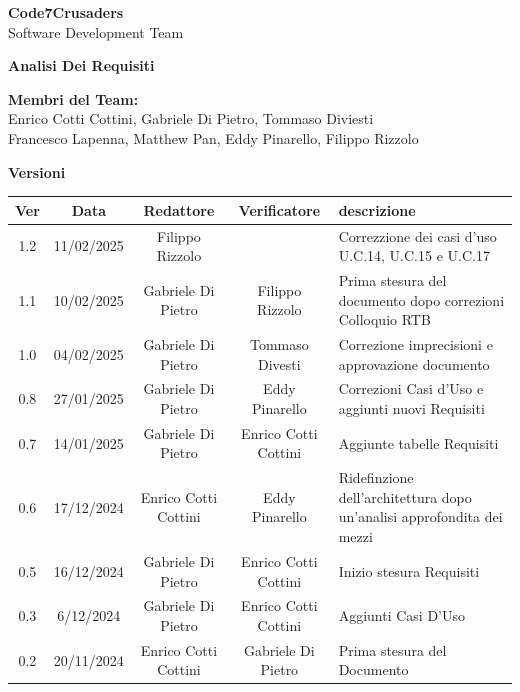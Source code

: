 \documentclass{article}
\begin{document}
\begin{titlepage}
    {\Huge \textbf{Code7Crusaders}}\\
    \vspace{0.5cm}
    {\Large Software Development Team}\\
    \vspace{2cm}
    
    \large \textbf{Analisi Dei Requisiti}
    \vspace{3.9cm}

    \textbf{Membri del Team:}\\
    Enrico Cotti Cottini, Gabriele Di Pietro, Tommaso Diviesti \\
    Francesco Lapenna, Matthew Pan, Eddy Pinarello, Filippo Rizzolo \\
    \vspace{0.5cm}
    
    \vspace{1cm}
\end{titlepage}



\newpage
\begin{center}
    \textbf{Versioni}
    \\
    \vspace{0.3cm}
    \begin{tabular}{|c|c|c|c|>{\centering\arraybackslash}m{}|}
        \hline
        \textbf{Ver} & \textbf{Data} & \textbf{Redattore} & \textbf{Verificatore} & \textbf{descrizione}\\
        \hline
        1.2 & 11/02/2025 & Filippo Rizzolo &  & Correzzione dei casi d'uso U.C.14, U.C.15 e U.C.17 \\
        1.1 & 10/02/2025 & Gabriele Di Pietro & Filippo Rizzolo & Prima stesura del documento dopo correzioni Colloquio RTB \\
        1.0 & 04/02/2025 & Gabriele Di Pietro & Tommaso Divesti & Correzione imprecisioni e approvazione documento \\
        0.8 & 27/01/2025 & Gabriele Di Pietro & Eddy Pinarello & Correzioni Casi d'Uso e aggiunti nuovi Requisiti \\
        0.7 & 14/01/2025 & Gabriele Di Pietro & Enrico Cotti Cottini & Aggiunte tabelle Requisiti \\
        0.6 & 17/12/2024 & Enrico Cotti Cottini & Eddy Pinarello & Ridefinzione dell'architettura dopo un'analisi approfondita dei mezzi \\
        0.5 & 16/12/2024 & Gabriele Di Pietro & Enrico Cotti Cottini & Inizio stesura Requisiti \\
        0.3 & 6/12/2024 & Gabriele Di Pietro & Enrico Cotti Cottini & Aggiunti Casi D'Uso \\
        0.2 & 20/11/2024 & Enrico Cotti Cottini & Gabriele Di Pietro & Prima stesura del Documento \\
        \hline
    \end{tabular}
\end{center}

\newpage
\tableofcontents
\listoftables
\listoffigures

\newpage



\newpage



\newpage



\newpage


\end{document}
